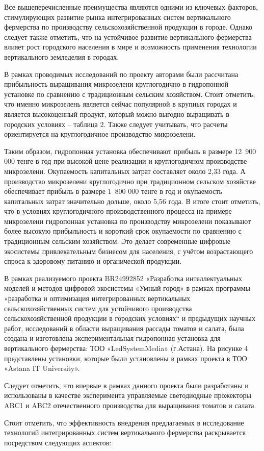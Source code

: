 \begin{multicols}{2}
Все вышеперечисленные преимущества являются одними из ключевых факторов,
стимулирующих развитие рынка интегрированных систем вертикального
фермерства по производству сельскохозяйственной продукции в городе.
Однако следует также отметить, что на устойчивое развитие вертикального
фермерства влияет рост городского населения в мире и возможность
применения технологии вертикального земледелия в городах.

В рамках проводимых исследований по проекту авторами были рассчитана
прибыльность выращивания микрозелени круглогодично в гидропонной
установке по сравнению с традиционным сельским хозяйством. Стоит
отметить, что именно микрозелень является сейчас популярной в крупных
городах и является высокоценный продукт, который можно выгодно
выращивать в городских условиях -- таблица 2. Также следует учитывать,
что расчеты ориентируется на круглогодичное производство микрозелени.

Таким образом, гидропонная установка обеспечивают прибыль в размере
12~900 000 тенге в год при высокой цене реализации и круглогодичном
производстве микрозелени. Окупаемость капитальных затрат составляет
около 2,33 года. А производство микрозелени круглогодично при
традиционном сельском хозяйстве обеспечивает прибыль в размере 1~800 000
тенге в год и окупаемость капитальных затрат значительно дольше, около
5,56 года. В итоге стоит отметить, что в условиях круглогодичного
производственного процесса на примере микрозелени гидропонная установка
по производству микрозелени показывают более высокую прибыльность и
короткий срок окупаемости по сравнению с традиционным сельским
хозяйством. Это делает современные цифровые экосистемы привлекательным
бизнесом для населения, с учётом возрастающего спроса к здоровому
питанию и органической продукции.

В рамках реализуемого проекта BR24992852 «Разработка интеллектуальных
моделей и методов цифровой экосистемы «Умный город» в рамках программы
«разработка и оптимизация интегрированных вертикальных
сельскохозяйственных систем для устойчивого производства
сельскохозяйственной продукции в городских условиях`` и предыдущих
научных работ, исследований в области выращивания рассады томатов и
салата, была создана и изготовлена экспериментальная гидропонная
установка для вертикального фермерства: ТОО «LedSystemMedia» (г.Астана).
На рисунке 4 представлены установки, которые были установлены в рамках
проекта в ТОО «Astana IT University».

Следует отметить, что впервые в рамках данного проекта были разработаны
и использованы в качестве эксперимента управляемые светодиодные
прожекторы ABC1 и ABC2 отечественного производства для выращивания
томатов и салата.

Стоит отметить, что эффективность внедрения предлагаемых в исследование
технологий интегрированных систем вертикального фермерства раскрывается
посредством следующих аспектов:

\end{multicols}


